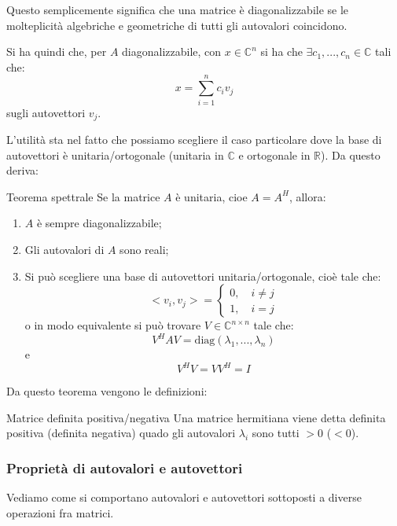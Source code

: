 \documentclass[a4paper,11pt]{article}
\begin{document}
Questo semplicemente significa che una matrice è diagonalizzabile se le molteplicità algebriche e geometriche di tutti gli autovalori coincidono. 

Si ha quindi che, per $A$ diagonalizzabile, con $x \in \mathbb{C}^n$ si ha che $\exists c_1, ..., c_n \in \mathbb{C}$ tali che:
$$
x = \sum_{i = 1}^n c_i v_j
$$
sugli autovettori $v_j$.

L'utilità sta nel fatto che possiamo scegliere il caso particolare dove la base di autovettori è unitaria/ortogonale (unitaria in $\mathbb{C}$ e ortogonale in $\mathbb{R}$).
Da questo deriva:
\begin{theorem}{Teorema spettrale}
	Se la matrice $A$ è unitaria, cioe $A = A^H$, allora:
	\begin{enumerate}
		\item $A$ è sempre diagonalizzabile;
		\item Gli autovalori di $A$ sono reali;
		\item Si può scegliere una base di autovettori unitaria/ortogonale, cioè tale che:
			\[
				< v_i, v_j > = 	
				\begin{cases}
					0, \quad i \neq j \\ 
					1, \quad i = j
				\end{cases}
			\]
			o in modo equivalente si può trovare $V \in \mathbb{C}^{n \times n}$ tale che:
			$$
				V^H A V = \mathrm{diag}(\lambda_1, ..., \lambda_n)
			$$
			e
			$$
			V^H V = V V^H = I
			$$
	\end{enumerate}
\end{theorem}

Da questo teorema vengono le definizioni:
\begin{definition}{Matrice definita positiva/negativa}
	Una matrice hermitiana viene detta definita positiva (definita negativa) quado gli autovalori $\lambda_i$ sono tutti $> 0$ ($< 0$).
\end{definition}

\subsubsection{Proprietà di autovalori e autovettori}
Vediamo come si comportano autovalori e autovettori sottoposti a diverse operazioni fra matrici.
\end{document}
